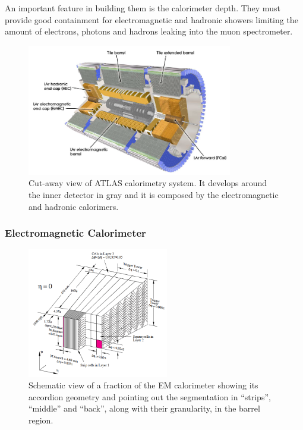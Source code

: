 An important feature in building them is the calorimeter depth. They must provide good containment for electromagnetic and hadronic showers limiting the amount of electrons, photons and hadrons leaking into the muon spectrometer.

\begin{figure}[tp]
\centering
\includegraphics[width=0.8\textwidth]{LHC_ATLAS/Calorimetry}
\caption{Cut-away view of ATLAS calorimetry system. It develops around the inner detector in gray and it is composed by the electromagnetic and hadronic calorimers.}
\label{fig:Calos}
\end{figure}

\subsubsection{Electromagnetic Calorimeter}
\begin{figure}[tp]
\centering
\includegraphics[width=0.55\textwidth]{LHC_ATLAS/EMcalo}
\caption{Schematic view of a fraction of the EM calorimeter showing its accordion geometry and pointing out the segmentation in ``strips'', ``middle'' and ``back'', along with their granularity, in the  barrel region.}
\label{fig:EMlayers}
\end{figure}

